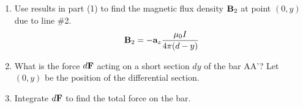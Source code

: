 \documentclass[../../header.tex]{subfiles}
\begin{document}
\begin{enumerate}
\item Use results in part (1) to find the magnetic flux density $\mathbf{B}_2$ at point $(0,y)$ due to line \#2.
\begin{align*}
\mathbf{B}_2 = -\mathbf{a}_z \frac{\mu_0 I}{4\pi (d-y)}
\end{align*}


\item What is the  force  $d\mathbf{F}$ acting on a short section $dy$ of the bar AA'? Let $(0,y)$ be the position of the differential section.


\item Integrate $d\mathbf{F}$ to find the total force on the bar.

\end{enumerate}
\end{document}
